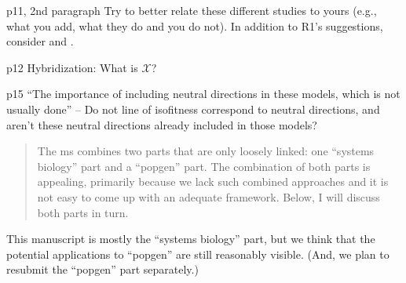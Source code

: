 
\begin{point}{p11, 2nd paragraph}
    Try to better relate these different studies to yours
(e.g., what you add, what they do and you do not). In addition to R1's
suggestions, consider \citet{weinreich2013fishers} and \citet{blanquart2016epistasis}.
\end{point}


\begin{point}{p12 Hybridization:}
    What is $\mathcal{X}$?
\end{point}


\begin{point}{p15}
    ``The importance of including neutral directions in these models, which
is not usually done'' -- Do not line of isofitness correspond to neutral
directions, and aren't these neutral directions already included in those
models?
\end{point}





\begin{quote}
The ms combines two parts that are only loosely linked: one ``systems biology''
part and a ``popgen'' part. The combination of both parts is appealing, primarily
because we lack such combined approaches and it is not easy to come up with an
adequate framework. Below, I will discuss both parts in turn.
\end{quote}

This manuscript is mostly the ``systems biology'' part,
but we think that the potential applications to ``popgen'' are still reasonably visible.
(And, we plan to resubmit the ``popgen'' part separately.)


